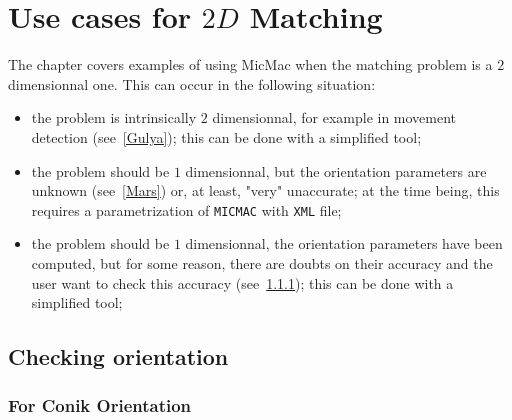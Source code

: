 \chapter{Use cases for $2D$ Matching}

The chapter covers examples of using MicMac when the matching problem is
a $2$ dimensionnal one. This can occur in the following situation:


\begin{itemize}
   \item the problem is intrinsically $2$ dimensionnal, for example in
         movement detection (see~\ref{Gulya}); this can be done with a simplified tool;

   \item the problem should be $1$ dimensionnal, but the orientation parameters
         are unknown (see~\ref{Mars}) or, at least, "very" unaccurate; at the time being,
         this requires a parametrization of {\tt MICMAC} with {\tt XML} file;

   \item the problem should be $1$ dimensionnal, the orientation parameters have been computed,
         but for some reason, there are doubts on their accuracy and the user want to check
         this accuracy (see~\ref{CheckOri});  this can be done with a simplified tool;
\end{itemize}



\section{Checking orientation}

\subsection{For Conik Orientation}
\label{CheckOri}

